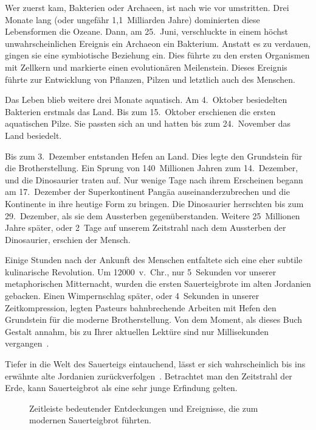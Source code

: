 Wer zuerst kam, Bakterien oder Archaeen, ist nach wie vor umstritten. Drei
Monate lang (oder ungefähr 1,1~Milliarden Jahre) dominierten diese Lebensformen
die Ozeane. Dann, am 25.~Juni, verschluckte in einem höchst unwahrscheinlichen Ereignis ein Archaeon ein Bakterium.
Anstatt es zu verdauen, gingen sie eine symbiotische Beziehung ein. Dies führte zu den
ersten Organismen mit Zellkern und markierte einen evolutionären Meilenstein. Dieses Ereignis
führte zur Entwicklung von Pflanzen, Pilzen und letztlich auch des Menschen.

Das Leben blieb weitere drei Monate aquatisch.
Am 4.~Oktober besiedelten Bakterien erstmals das Land. Bis zum 15.~Oktober erschienen
die ersten aquatischen Pilze. Sie passten sich an und hatten bis zum 24.~November das
Land besiedelt.

Bis zum 3.~Dezember entstanden Hefen an Land. Dies legte den Grundstein für die Brotherstellung.
Ein Sprung von 140~Millionen Jahren zum 14.~Dezember, und die Dinosaurier traten auf. Nur wenige
Tage nach ihrem Erscheinen begann am 17.~Dezember der Superkontinent Pangäa
auseinanderzubrechen und die Kontinente in ihre heutige Form zu bringen.
Die Dinosaurier herrschten bis zum 29.~Dezember, als sie dem Aussterben gegenüberstanden.
Weitere 25~Millionen Jahre später, oder 2~Tage auf unserem Zeitstrahl nach dem Aussterben
der Dinosaurier, erschien der Mensch.

Einige Stunden nach der Ankunft des Menschen entfaltete sich eine eher subtile kulinarische
Revolution. Um \num{12000}~v.~Chr., nur 5~Sekunden vor unserer
metaphorischen Mitternacht, wurden die ersten Sauerteigbrote im alten
Jordanien gebacken. Einen Wimpernschlag später, oder 4~Sekunden in unserer Zeitkompression,
legten Pasteurs bahnbrechende Arbeiten mit Hefen den Grundstein für die moderne
Brotherstellung. Von dem Moment, als dieses Buch Gestalt annahm, bis zu Ihrer aktuellen
Lektüre sind nur Millisekunden vergangen~\cite{Yong+2017}.

Tiefer in die Welt des Sauerteigs eintauchend, lässt er sich wahrscheinlich bis ins erwähnte
alte Jordanien zurückverfolgen~\cite{jordan+bread}. Betrachtet man den Zeitstrahl der Erde, kann
Sauerteigbrot als eine sehr junge Erfindung gelten.

\begin{figure}[!htb]
  \centering
  
  \caption[Zeitleiste der Sauerteig-Geschichte]{Zeitleiste bedeutender Entdeckungen und
  Ereignisse, die zum modernen Sauerteigbrot führten.}%
  \label{fig:sourdough-timeline}
\end{figure}

